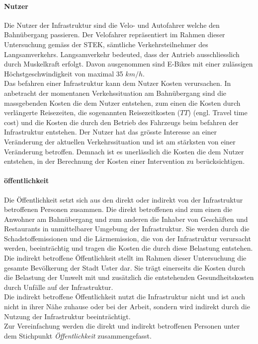 \paragraph{Nutzer}

Die Nutzer der Infrastruktur sind die Velo- und Autofahrer welche den Bahnübergang passieren. Der Velofahrer repräsentiert im Rahmen dieser Untersuchung gemäss der STEK, sämtliche Verkehrsteilnehmer des Langsamverkehrs. Langsamverkehr bedeuted, dass der Antrieb ausschliesslich durch Muskelkraft erfolgt. Davon ausgenommen sind E-Bikes mit einer zulässigen Höchstgeschwindigkeit von maximal 35 $km/h$. \\
Das befahren einer Infrastruktur kann dem Nutzer Kosten verursachen. In anbetracht der momentanen Verkehssituation am Bahnübergang sind die massgebenden Kosten die dem Nutzer entstehen, zum einen die Kosten durch verlängerte Reisezeiten, die sogenannten Reisezeitkosten ($TT$) (engl. Travel time cost) und die Kosten die durch den Betrieb des Fahrzeugs beim befahren der Infrastruktur entstehen.  
Der Nutzer hat das grösste Interesse an einer Veränderung der aktuellen Verkehrssituation und ist am stärksten von einer Veränderung betroffen. Demnach ist es unerlässlich die Kosten die dem Nutzer entstehen, in der Berechnung der Kosten einer Intervention zu berücksichtigen.


\paragraph{öffentlichkeit}

Die Öffentlichkeit setzt sich aus den direkt oder indirekt von der Infrastruktur betroffenen Personen zusammen. 
Die direkt betroffenen sind zum einen die Anwohner am Bahnübergang und zum anderen die Inhaber von Geschäften und Restaurants in unmittelbarer Umgebung der Infrastruktur. Sie werden durch die Schadstoffemissionen und die Lärmemission, die von der Infrastruktur verursacht werden, beeinträchtig und tragen die Kosten die durch diese Belastung entstehen. 
Die indirekt betroffene Öffentlichkeit stellt im Rahmen dieser Untersuchung die gesamte Bevölkerung der Stadt Uster dar. 
Sie trägt einerseits die Kosten durch die Belastung der Umwelt mit und zusätzlich die entstehenden Gesundheitskosten durch Unfälle auf der Infrastruktur. \\
Die indirekt betroffene Öffentlichkeit nutzt die Infrastruktur nicht und ist auch nicht in ihrer Nähe zuhause oder bei der Arbeit, sondern wird indirekt durch die Nutzung der Infrastruktur beeinträchtigt. \\
Zur Vereinfachung werden die direkt und indirekt betroffenen Personen unter dem Stichpunkt \textit{Öffentlichkeit} zusammengefasst.
 


%

